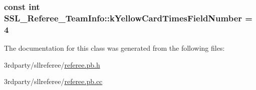 \hypertarget{class_s_s_l___referee___team_info_a18a4fe3328abaeea6672cddccbed1fe4}{
\subsubsection[{k\-Yellow\-Card\-Times\-Field\-Number}]{\setlength{\rightskip}{0pt plus 5cm}const int S\-S\-L\-\_\-\-Referee\-\_\-\-Team\-Info\-::k\-Yellow\-Card\-Times\-Field\-Number = 4\hspace{0.3cm}{\ttfamily [static]}}}\label{class_s_s_l___referee___team_info_a18a4fe3328abaeea6672cddccbed1fe4}


The documentation for this class was generated from the following files\-:\begin{DoxyCompactItemize}
\item 
3rdparty/sllreferee/\hyperlink{referee_8pb_8h}{referee.\-pb.\-h}\item 
3rdparty/sllreferee/\hyperlink{referee_8pb_8cc}{referee.\-pb.\-cc}\end{DoxyCompactItemize}

